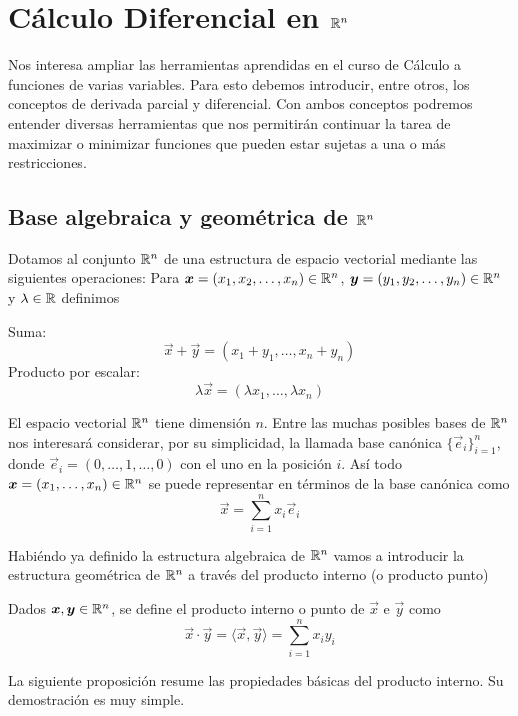 
\chapter{C\'alculo Diferencial en \texorpdfstring{$\mathbb{R}^n$}{Rn}}\label{cap1}


Nos interesa ampliar las herramientas aprendidas en el curso de C\'alculo a funciones de varias variables. Para esto debemos introducir, entre otros, los conceptos de derivada parcial y diferencial. Con ambos conceptos podremos entender diversas herramientas que nos permitir\'an continuar la tarea de maximizar o minimizar funciones que pueden estar sujetas a una o m\'as restricciones.

\section{Base algebraica y geom\'etrica de \texorpdfstring{$\mathbb{R}^n$}{Rn}}

\begin{definicion}  
Dotamos al conjunto $\mathbb{R}^n$ de una estructura de
espacio vectorial mediante las siguientes operaciones: Para $\boldsymbol{x}=(x_1,x_2,\ldots,x_n) \in \mathbb{R}^n$, $\boldsymbol{y}=(y_1,y_2,\ldots,y_n)\in 
\mathbb{R}^n$ y $\lambda \in \mathbb{R}$ definimos

Suma:\[\vec{x}+\vec{y} =(x_1+y_1,\ldots,x_n+y_n)\]
Producto por escalar: \[\lambda \vec{x}=(\lambda x_1,\ldots,\lambda x_n)\]
\end{definicion}

El espacio vectorial $\mathbb{R}^n$ tiene dimensi\'on $n$. Entre las muchas posibles bases
de $\mathbb{R}^n$ nos interesar\'a considerar, por su simplicidad, la llamada base can\'onica $\{\vec{e}_i\}_{i=1}^n$, donde $\vec{e}_i=(0,\ldots,1,\ldots,0)$ con el uno en la
posici\'on $i$. As\'i todo $\boldsymbol{x}=(x_1,\ldots,x_n)\in\mathbb{R}^n$ se puede representar 
en t\'erminos de la base can\'onica como
\[\vec{x}=\sum_{i=1}^n{x_i\vec{e}_i}\]

Habi\'endo ya definido la estructura algebraica de $\mathbb{R}^n$ vamos a introducir la
estructura geom\'etrica de $\mathbb{R}^n$ a trav\'es del producto interno (o producto punto)
\begin{definicion} 
Dados $\boldsymbol{x},\boldsymbol{y} \in \mathbb{R}^n$, se define el producto interno o punto
de $\vec{x}$ e $\vec{y}$ como
$$\vec{x}\cdot \vec{y}=\langle \vec{x},\vec{y}\rangle = \sum_{i=1}^n{x_i}{y_i}$$
\end{definicion}    
La siguiente proposici\'on resume las propiedades b\'asicas del producto interno.
Su demostraci\'on es muy simple.


